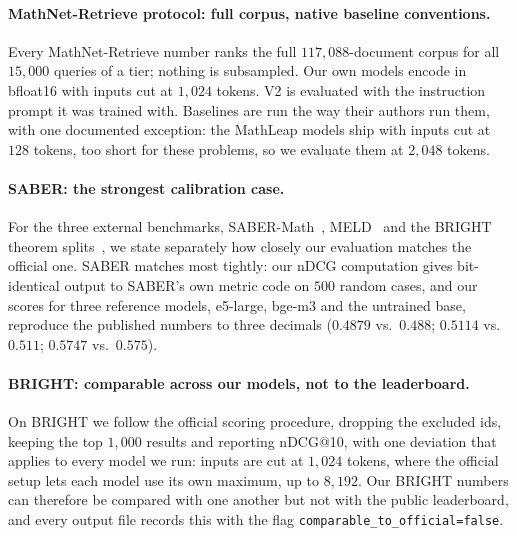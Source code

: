 \paragraph{MathNet-Retrieve protocol: full corpus, native baseline conventions.}Every MathNet-Retrieve number ranks the full $117{,}088$-document corpus for all $15{,}000$ queries of a tier; nothing is subsampled. Our own models encode in bfloat16 with inputs cut at $1{,}024$ tokens. V2 is evaluated with the instruction prompt it was trained with. Baselines are run the way their authors run them, with one documented exception: the MathLeap models ship with inputs cut at $128$ tokens, too short for these problems, so we evaluate them at $2{,}048$ tokens.

\paragraph{SABER: the strongest calibration case.}For the three external benchmarks, SABER-Math~\citep{georgiev2026saber}, MELD~\citep{ye2026meld} and the BRIGHT theorem splits~\citep{su2025bright}, we state separately how closely our evaluation matches the official one. SABER matches most tightly: our nDCG computation gives bit-identical output to SABER's own metric code on $500$ random cases, and our scores for three reference models, e5-large, bge-m3 and the untrained base, reproduce the published numbers to three decimals ($0.4879$ vs.\ $0.488$; $0.5114$ vs.\ $0.511$; $0.5747$ vs.\ $0.575$).

\paragraph{BRIGHT: comparable across our models, not to the leaderboard.}On BRIGHT we follow the official scoring procedure, dropping the excluded ids, keeping the top $1{,}000$ results and reporting nDCG@10, with one deviation that applies to every model we run: inputs are cut at $1{,}024$ tokens, where the official setup lets each model use its own maximum, up to $8{,}192$. Our BRIGHT numbers can therefore be compared with one another but not with the public leaderboard, and every output file records this with the flag \texttt{comparable\_to\_official=false}.

